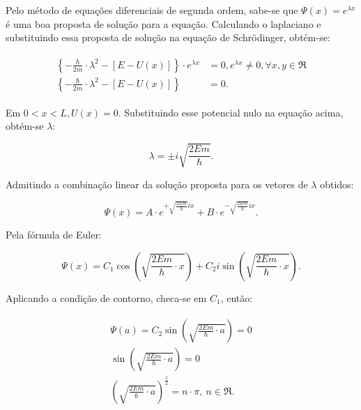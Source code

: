   \par Pelo método de equações diferenciais de segunda ordem, sabe-se que $\Psi(x)=e^{\lambda x}$ é uma boa proposta de solução para a equação. Calculando o laplaciano e substituindo essa proposta de solução na equação de Schrödinger, obtém-se:

  \begin{align}
    \label{schrodinger_6}
        \begin{array}{ll}
          \displaystyle \left\{ -\frac{\hbar}{2m}\cdot \lambda^2 - \left[ E - U(x) \right] \right\} \cdot e^{\lambda x} &= 0, e^{\lambda x} \neq 0, \forall x,y \in \Re\\
          \displaystyle \left\{ -\frac{\hbar}{2m}\cdot \lambda^2 - \left[ E - U(x) \right] \right\} &= 0.
        \end{array}
  \end{align}

  \par Em $0<x<L, U(x)=0$. Substituindo esse potencial nulo na equação acima, obtém-se $\lambda$\cite{frustrado7}:

  \begin{equation}
    \label{schrodinger_7}
    \lambda = \pm i\sqrt{\frac{2Em}{\hbar}}.
  \end{equation}

  \par Admitindo a combinação linear da solução proposta para os vetores de $\lambda$ obtidos:

  \begin{equation}
    \label{schrodinger_8}
    \Psi(x) = A\cdot e^{+\sqrt{\frac{2Em}{\hbar}}ix} + B\cdot e^{-\sqrt{\frac{2Em}{\hbar}}ix} .     
  \end{equation}    

  \par Pela fórmula de Euler:

  \begin{equation}
    \label{schrodinger_9}
    \Psi(x) = C_{1} \cos \left(  \sqrt{\frac{2Em}{\hbar} \cdot x }  \right) + C_{2}i \sin \left( \sqrt{\frac{2Em}{\hbar} \cdot x }  \right).
  \end{equation}

  \par Aplicando a condição de contorno, checa-se em $C_{1}$, então:

  \begin{align}
    \label{schrodinger_10} 
    \begin{array}{ll}
      \Psi(a) = C_{2} \sin \left(  \sqrt{\frac{2Em}{\hbar} \cdot a }  \right) = 0\\
      \sin \left(  \sqrt{\frac{2Em}{\hbar} \cdot a }  \right) = 0\\
      \left(  \sqrt{\frac{2Em}{\hbar} \cdot a }  \right)^{\frac{1}{2}} = n\cdot\pi,\ n\in\Re.
    \end{array}
  \end{align}

